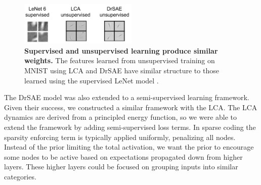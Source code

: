 \begin{figure}
    \centering
    \includegraphics[width=0.5\textwidth]{figures/lenet_lca_drsae_weights.png}
    \caption{\textbf{Supervised and unsupervised learning produce similar weights.} The features learned from unsupervised training on MNIST using LCA \parencite{rozell2008sparse} and DrSAE \parencite{rolfe2013discriminative} have similar structure to those learned using the supervised LeNet model \parencite{lecun1998gradient}.}
    \label{fig:ch3_lenet_lca_drsae_weights}
\end{figure}

The DrSAE model was also extended to a semi-supervised learning framework. Given their success, we constructed a similar framework with the LCA. The LCA dynamics are derived from a principled energy function, so we were able to extend the framework by adding semi-supervised loss terms. In sparse coding the sparsity enforcing term is typically applied uniformly, penalizing all nodes. Instead of the prior limiting the total activation, we want the prior to encourage some nodes to be active based on expectations propagated down from higher layers. These higher layers could be focused on grouping inputs into similar categories.

